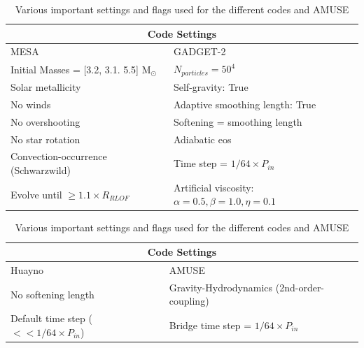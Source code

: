 \begin{table}[H]
    \centering
    \begin{tabular}{ |p{6.5cm}||p{6.5cm}|  }
     \hline
     \multicolumn{2}{|c|}{Code Settings} \\
     \hline
     MESA & GADGET-2 \\
     \hline
     Initial Masses = [3.2, 3.1. 5.5] M$_{\odot}$& $N_{particles}=50^4$ \\
     Solar metallicity& Self-gravity: True\\
     No winds& Adaptive smoothing length: True\\
     No overshooting& Softening = smoothing length\\
     No star rotation & Adiabatic \ac{eos}  \\
     Convection-occurrence (Schwarzwild) & Time step = $1/64 \times P_{in}$ \\
     Evolve until $\geq 1.1 \times R_{RLOF}$ & Artificial viscosity: $\alpha=0.5, \beta=1.0, \eta=0.1$ \\
     \hline
    \end{tabular}
        \centering
    \begin{tabular}{ |p{6.5cm}||p{6.5cm}|  }
     \hline
     \multicolumn{2}{|c|}{Code Settings} \\
     \hline
     Huayno & AMUSE \\
     \hline
     No softening length & Gravity-Hydrodynamics (2nd-order-coupling)\\
     Default time step ($<< 1/64 \times P_{in}$) &  Bridge time step = $1/64 \times P_{in}$\\
     \hline
    \end{tabular}
    \caption{ Various important settings and flags used for the different codes and AMUSE}
\label{tab:codes_settings}
\end{table}
